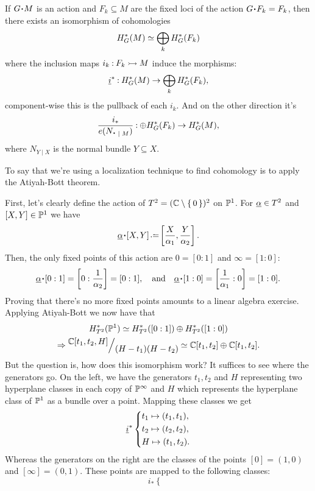 \documentclass[12pt]{memoir}
\begin{document}
\begin{Th}
    If $G\.M$ is an action and $F_k\subseteq M$ are the fixed loci of the action $G\.F_k=F_k$, then there exists an isomorphism of cohomologies
    $$H^\ast_G(M)\simeq \bigoplus_kH^\ast_G(F_k)$$
    where the inclusion maps $i_k\mathbin{:} F_k\rightarrowtail M$ induce the morphisms:
    $$\underline{i}^\ast\mathbin{:}H^\ast_G(M)\to\bigoplus_kH^\ast_G(F_k),$$
    component-wise this is the pullback of each $i_k$. And on the other direction it's
 $$\frac{i_\ast}{e(N_{\.\mid M})}\:\oplus H^\ast_G(F_k)\to H^\ast_G(M),$$ 
 where $N_{Y\mid X}$ is the normal bundle $Y\subseteq X$.
\end{Th}

To say that we're using a localization technique to find cohomology is to apply the Atiyah-Bott theorem.

\begin{Ex}
First, let's clearly define the action of $T^2=(\bC\less\set{0})^2$ on $\bP^1$. For $\un{\al}\in T^2$ and $[X,Y]\in\bP^1$ we have
$$\un{\al}\.[X,Y]\defeq \bonj{\frac{X}{\al_1},\frac{Y}{\al_2}}.$$
Then, the only fixed points of this action are $0=[0:1]$ and $\infty=[1:0]$:
$$\un{\al}\.[0:1]=\bonj{0:\frac{1}{\al_2}}=[0:1],\word{and}\un{\al}\.[1:0]=\bonj{\frac{1}{\al_1}:0}=[1:0].$$
Proving that there's no more fixed points amounts to a linear algebra exercise. Applying Atiyah-Bott we now have that 
\begin{gather*}
    H_{T^2}^\ast(\bP^1)\isom H_{T^2}^\ast([0:1])\oplus H_{T^2}^\ast([1:0])\\
    \To\quot{\bC[t_1,t_2,H]}{(H-t_1)(H-t_2)}\isom \bC[t_1,t_2]\oplus\bC[t_1,t_2].
\end{gather*} But the question is, how does this isomorphism work? It suffices to see where the generators go. On the left, we have the generators $t_1, t_2$ and $H$ representing two hyperplane classes in each copy of $\bP^\infty$ and $H$ which represents the hyperplane class of $\bP^1$ as a bundle over a point. Mapping these classes we get
$$\un i^\ast\left\lbrace
\begin{aligned}
    &t_1\mapsto (t_1,t_1),\\
    &t_2\mapsto (t_2,t_2),\\
    &H\mapsto (t_1,t_2).
\end{aligned}
\right.$$
Whereas the generators on the right are the classes of the points $[0]=(1,0)$ and $[\infty]=(0,1)$. These points are mapped to the following classes:
$$i_\ast\left\lbrace
\begin{aligned}

\end{aligned}$$
\end{Ex}
\end{document}
